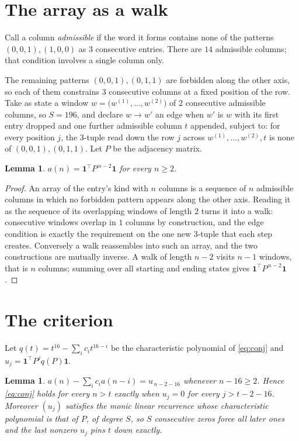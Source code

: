 \documentclass[11pt,a4paper]{article}
\theoremstyle{plain}
\newtheorem{lemma}[theorem]{Lemma}
\theoremstyle{definition}
\begin{document}
\section{The array as a walk}

Call a column \emph{admissible} if the word it forms contains none of the patterns
$(0,0,1), (1,0,0)$ as $3$ consecutive entries. There are $14$ admissible columns; that condition
involves a single column only.

The remaining patterns $(0,0,1), (0,1,1)$ are forbidden along the other axis, so each of them
constrains $3$ consecutive columns at a fixed position of the row. Take as state a
window $w=\bigl(w^{(1)},\dots,w^{(2)}\bigr)$ of $2$ consecutive admissible
columns, so $S=196$, and declare $w\to w'$ an edge when $w'$ is $w$ with its first entry
dropped and one further admissible column $t$ appended, subject to: for every position
$j$, the $3$-tuple read down the row $j$ across $w^{(1)},\dots,w^{(2)},t$
is none of $(0,0,1), (0,1,1)$. Let $P$ be the adjacency matrix.

\begin{lemma}\label{lem:walk}
$a(n)=\mathbf{1}^{\!\top}P^{\,n-2}\mathbf{1}$ for every $n\ge2$.
\end{lemma}

\begin{proof}
An array of the entry's kind with $n$ columns is a sequence of $n$ admissible columns in
which no forbidden pattern appears along the other axis. Reading it as the sequence of its
overlapping windows of length $2$ turns it into a walk: consecutive windows overlap in
$1$ columns by construction, and the edge condition is exactly the requirement on the one
new $3$-tuple that each step creates. Conversely a walk reassembles into such an array,
and the two constructions are mutually inverse. A walk of length $n-2$ visits $n-1$
windows, that is $n$ columns; summing over all starting and ending states gives
$\mathbf{1}^{\!\top}P^{\,n-2}\mathbf{1}$.
\end{proof}

\section{The criterion}

Let $q(t)=t^{16}-\sum_i c_i t^{16-i}$ be the characteristic polynomial of
\eqref{eq:conj} and $u_j=\mathbf{1}^{\!\top}P^{j}q(P)\mathbf{1}$.

\begin{lemma}\label{lem:crit}
$a(n)-\sum_i c_i a(n-i)=u_{\,n-2-16}$ whenever $n-16\ge2$. Hence
\eqref{eq:conj} holds for every $n>t$ exactly when $u_j=0$ for every
$j>t-2-16$. Moreover $(u_j)$ satisfies the monic linear recurrence whose
characteristic polynomial is that of $P$, of degree $S$, so $S$ consecutive zeros force all
later ones and the last nonzero $u_j$ pins $t$ down exactly.
\end{lemma}
\end{document}

